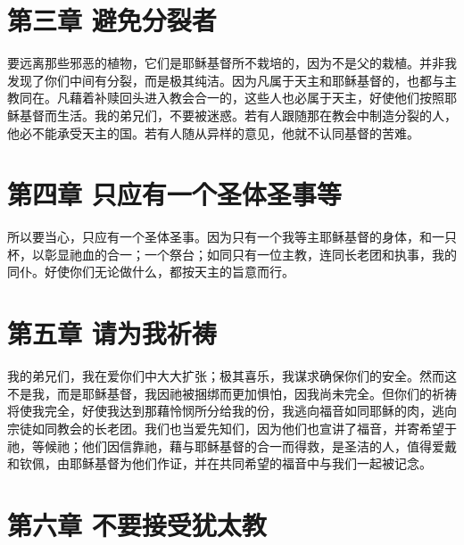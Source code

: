 
\section{第三章 避免分裂者}

要远离那些邪恶的植物，它们是耶稣基督所不栽培的，因为不是父的栽植。并非我发现了你们中间有分裂，而是极其纯洁。因为凡属于天主和耶稣基督的，也都与主教同在。凡藉着补赎回头进入教会合一的，这些人也必属于天主，好使他们按照耶稣基督而生活。我的弟兄们，不要被迷惑。若有人跟随那在教会中制造分裂的人，他必不能承受天主的国。若有人随从异样的意见，他就不认同基督的苦难。\par


\section{第四章 只应有一个圣体圣事等}

所以要当心，只应有一个圣体圣事。因为只有一个我等主耶稣基督的身体，和一只杯，以彰显祂血的合一；一个祭台；如同只有一位主教，连同长老团和执事，我的同仆。好使你们无论做什么，都按天主的旨意而行。\par


\section{第五章 请为我祈祷}

我的弟兄们，我在爱你们中大大扩张；极其喜乐，我谋求确保你们的安全。然而这不是我，而是耶稣基督，我因祂被捆绑而更加惧怕，因我尚未完全。但你们的祈祷将使我完全，好使我达到那藉怜悯所分给我的份，我逃向福音如同耶稣的肉，逃向宗徒如同教会的长老团。我们也当爱先知们，因为他们也宣讲了福音，并寄希望于祂，等候祂；他们因信靠祂，藉与耶稣基督的合一而得救，是圣洁的人，值得爱戴和钦佩，由耶稣基督为他们作证，并在共同希望的福音中与我们一起被记念。\par


\section{第六章 不要接受犹太教}

